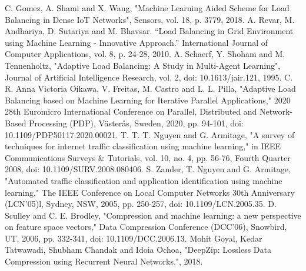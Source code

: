 \documentclass[conference]{IEEEtran}
\begin{document}
\begin{thebibliography}{1}
C. Gomez, A. Shami and X. Wang, "Machine Learning Aided Scheme for Load Balancing in Dense IoT Networks", Sensors, vol. 18, p. 3779, 2018.
A. Revar, M. Andhariya, D. Sutariya and M. Bhavsar. “Load Balancing in Grid Environment using Machine Learning - Innovative Approach.” International Journal of Computer Applications, vol. 8, p. 24-28, 2010.
A. Schaerf, Y. Shoham and M. Tennenholtz, "Adaptive Load Balancing: A Study in Multi-Agent Learning", Journal of Artificial Intelligence Research, vol. 2, doi: 10.1613/jair.121, 1995.
C. R. Anna Victoria Oikawa, V. Freitas, M. Castro and L. L. Pilla, "Adaptive Load Balancing based on Machine Learning for Iterative Parallel Applications," 2020 28th Euromicro International Conference on Parallel, Distributed and Network-Based Processing (PDP), Västerås, Sweden, 2020, pp. 94-101, doi: 10.1109/PDP50117.2020.00021.
T. T. T. Nguyen and G. Armitage, "A survey of techniques for internet traffic classification using machine learning," in IEEE Communications Surveys \& Tutorials, vol. 10, no. 4, pp. 56-76, Fourth Quarter 2008, doi: 10.1109/SURV.2008.080406.
S. Zander, T. Nguyen and G. Armitage, "Automated traffic classification and application identification using machine learning," The IEEE Conference on Local Computer Networks 30th Anniversary (LCN'05)l, Sydney, NSW, 2005, pp. 250-257, doi: 10.1109/LCN.2005.35.
D. Sculley and C. E. Brodley, "Compression and machine learning: a new perspective on feature space vectors," Data Compression Conference (DCC'06), Snowbird, UT, 2006, pp. 332-341, doi: 10.1109/DCC.2006.13.
Mohit Goyal, Kedar Tatwawadi, Shubham Chandak and Idoia Ochoa, "DeepZip: Lossless Data Compression using Recurrent Neural Networks.", 2018.

\end{thebibliography}




\end{document}
